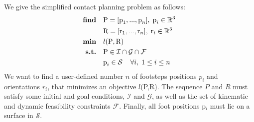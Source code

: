 We give the simplified contact planning problem as follows:
\begin{equation}
\label{eq:mip_simple}
\begin{aligned}
    \textrm{\textbf{find}}  \quad & \mbox{P}=[\mbox{p}_1,...,\mbox{p}_n], \;\mbox{p}_i \in \mathbb{R}^{3}\\
                            \quad & \mbox{R}=[\mbox{r}_1,...,\mbox{r}_n], \; \mbox{r}_i \in \mathbb{R}^{3}\\
    \textrm{\textbf{min}}  \quad & l(\mbox{P},\mbox{R})\\
    \textrm{\textbf{s.t.}}  \quad & \mbox{P} \in  \mathcal{I} \cap \mathcal{G} \cap \mathcal{F} \\
                            \quad & \mbox{p}_i \in \mathcal{S} \;\;\;\; \forall i, \; 1 \leq i \leq n
\end{aligned}
\end{equation}
We want to find a user-defined number $n$ of footsteps positions $p_i$ and orientations $r_i$, that minimizes an objective $l$(P,R).
The sequence $P$ and $R$ must satisfy some initial and goal conditions, $\mathcal{I}$ and $\mathcal{G}$, as well as the set of kinematic and dynamic feasibility constraints $\mathcal{F}$.
Finally, all foot positions p$_i$ must lie on a surface in $\mathcal{S}$.

